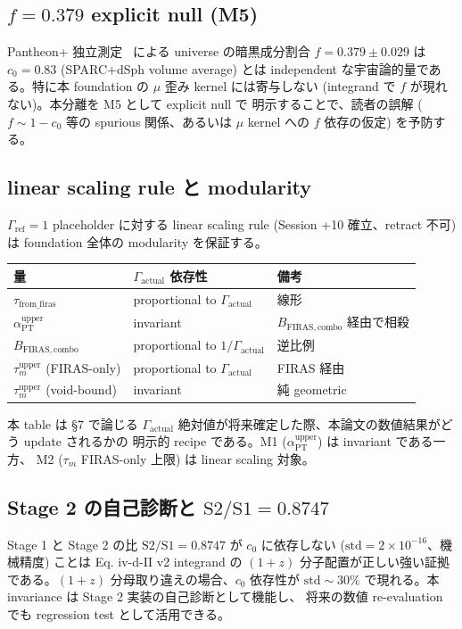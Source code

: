 \documentclass[11pt,a4paper]{ltjsarticle}
\newcommand{\aPT}{\alpha_{\mathrm{PT}}}
\newcommand{\taum}{\tau_{m}}
\newcommand{\BFIRAS}{B_{\mathrm{FIRAS,combo}}}
\newcommand{\Gammaref}{\Gamma_{\mathrm{ref}}}
\newcommand{\Gammaact}{\Gamma_{\mathrm{actual}}}
\begin{document}
\subsection{$f = 0.379$ explicit null (M5)}
Pantheon+ 独立測定~\citep{Scolnic2022} による universe の暗黒成分割合 $f = 0.379 \pm 0.029$ は
$c_0 = 0.83$ (SPARC+dSph volume average) とは independent な宇宙論的量である。特に本 foundation の
$\mu$ 歪み kernel には寄与しない (integrand で $f$ が現れない)。本分離を M5 として explicit null で
明示することで、読者の誤解 ($f \sim 1 - c_0$ 等の spurious 関係、あるいは $\mu$ kernel への
$f$ 依存の仮定) を予防する。

\subsection{linear scaling rule と modularity}
$\Gammaref = 1$ placeholder に対する linear scaling rule (Session +10 確立、retract 不可) は
foundation 全体の modularity を保証する。

\begin{center}\small
\begin{tabular}{@{}lll@{}}
\toprule
量 & $\Gammaact$ 依存性 & 備考 \\
\midrule
$\tau_{\mathrm{from\_firas}}$ & proportional to $\Gammaact$ & 線形 \\
$\aPT^{\mathrm{upper}}$ & invariant & $\BFIRAS$ 経由で相殺 \\
$\BFIRAS$ & proportional to $1/\Gammaact$ & 逆比例 \\
$\taum^{\mathrm{upper}}$ (FIRAS-only) & proportional to $\Gammaact$ & FIRAS 経由 \\
$\taum^{\mathrm{upper}}$ (void-bound) & invariant & 純 geometric \\
\bottomrule
\end{tabular}
\end{center}

本 table は \S 7 で論じる $\Gammaact$ 絶対値が将来確定した際、本論文の数値結果がどう update されるかの
明示的 recipe である。M1 ($\aPT^{\mathrm{upper}}$) は invariant である一方、
M2 ($\taum$ FIRAS-only 上限) は linear scaling 対象。

\subsection{Stage 2 の自己診断と $\mathrm{S2/S1} = 0.8747$}
Stage 1 と Stage 2 の比 $\mathrm{S2/S1} = 0.8747$ が $c_0$ に依存しない
($\mathrm{std} = 2 \times 10^{-16}$、機械精度) ことは Eq. iv-d-II v2 integrand の
$(1+z)$ 分子配置が正しい強い証拠である。$(1+z)$ 分母取り違えの場合、$c_0$ 依存性が
$\mathrm{std} \sim 30\%$ で現れる。本 invariance は Stage 2 実装の自己診断として機能し、
将来の数値 re-evaluation でも regression test として活用できる。
\end{document}
